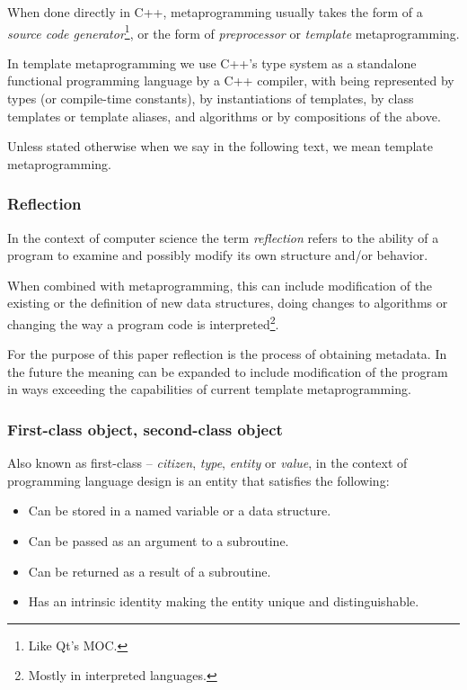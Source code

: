 When done directly in C++, metaprogramming usually takes the form of a
{\em source code generator}\footnote{Like Qt's MOC.}, or the form of {\em preprocessor}
or {\em template} metaprogramming.

In template metaprogramming we use C++'s type system
as a standalone functional programming language  by a C++
compiler, with  being
represented by types (or compile-time constants),
 by instantiations of templates,
 by class templates or template aliases, and
algorithms or  by compositions of the above.

Unless stated otherwise when we say  in the following text,
we mean template metaprogramming.

\subsubsection{Reflection}

In the context of computer science
the term {\em reflection} refers to the ability of a program to examine
and possibly modify its own structure and/or behavior.

When combined with metaprogramming, this can include modification of the existing
or the definition of new data structures, doing changes to algorithms or changing the way
a program code is interpreted\footnote{Mostly in interpreted languages.}.

For the purpose of this paper reflection is the process of obtaining metadata.
In the future the meaning can be expanded to include modification of the program
in ways exceeding the capabilities of current template metaprogramming.

\subsubsection{First-class object, second-class object}
\label{term-first-class}

Also known as first-class -- {\em citizen}, {\em type}, {\em entity} or {\em value},
in the context of programming language design is an entity that satisfies
the following:

\begin{itemize}
	\item{Can be stored in a named variable or a data structure.}
	\item{Can be passed as an argument to a subroutine.}
	\item{Can be returned as a result of a subroutine.}
	\item{Has an intrinsic identity making the entity unique and distinguishable.}
\end{itemize}

